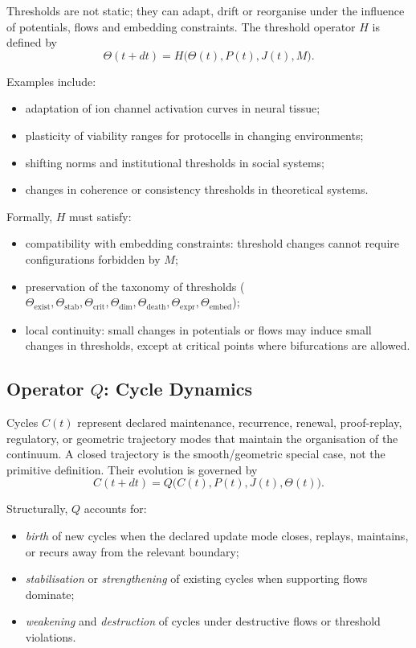 Thresholds are not static; they can adapt, drift or reorganise under the
influence of potentials, flows and embedding constraints. The threshold
operator \(H\) is defined by
\[
  \Theta(t+dt) = H\big(\Theta(t), P(t), J(t), M\big).
\]

Examples include:
\begin{itemize}
  \item adaptation of ion channel activation curves in neural tissue;
  \item plasticity of viability ranges for protocells in changing environments;
  \item shifting norms and institutional thresholds in social systems;
  \item changes in coherence or consistency thresholds in theoretical systems.
\end{itemize}

Formally, \(H\) must satisfy:
\begin{itemize}
  \item compatibility with embedding constraints: threshold changes cannot
        require configurations forbidden by \(M\);
  \item preservation of the taxonomy of thresholds
        (\(\Theta_{\mathrm{exist}}, \Theta_{\mathrm{stab}},
        \Theta_{\mathrm{crit}}, \Theta_{\mathrm{dim}},
        \Theta_{\mathrm{death}}, \Theta_{\mathrm{expr}}, \Theta_{\mathrm{embed}}\));
  \item local continuity: small changes in potentials or flows may induce small
        changes in thresholds, except at critical points where bifurcations are
        allowed.
\end{itemize}

\subsection{Operator \texorpdfstring{\texorpdfstring{$Q$}{Q}}{Q}: Cycle Dynamics}

Cycles \(C(t)\) represent declared maintenance, recurrence, renewal,
proof-replay, regulatory, or geometric trajectory modes that maintain the
organisation of the continuum. A closed trajectory is the smooth/geometric
special case, not the primitive definition. Their evolution is governed by
\[
  C(t+dt) = Q\big(C(t), P(t), J(t), \Theta(t)\big).
\]

Structurally, \(Q\) accounts for:
\begin{itemize}
  \item \emph{birth} of new cycles when the declared update mode closes,
        replays, maintains, or recurs away from the relevant boundary;
  \item \emph{stabilisation} or \emph{strengthening} of existing cycles when
        supporting flows dominate;
  \item \emph{weakening} and \emph{destruction} of cycles under destructive
        flows or threshold violations.
\end{itemize}

